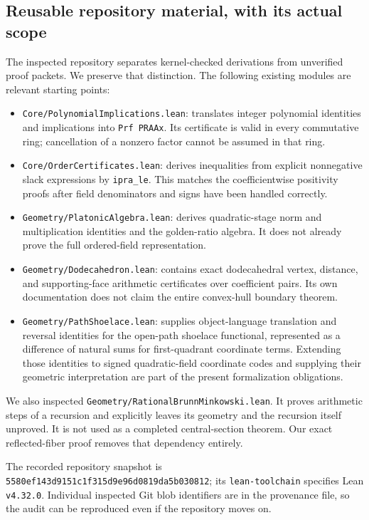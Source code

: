\subsection{Reusable repository material, with its actual scope}
The inspected repository separates kernel-checked derivations from
unverified proof packets. We preserve that distinction. The following
existing modules are relevant starting points:
\begin{itemize}
\item \texttt{Core/PolynomialImplications.lean}: translates integer
polynomial identities and implications into \texttt{Prf PRAAx}.
Its certificate is valid in every commutative ring; cancellation of
a nonzero factor cannot be assumed in that ring.
\item \texttt{Core/OrderCertificates.lean}: derives inequalities
from explicit nonnegative slack expressions by \texttt{ipra\_le}.
This matches the coefficientwise positivity proofs after field
denominators and signs have been handled correctly.
\item \texttt{Geometry/PlatonicAlgebra.lean}: derives quadratic-stage
norm and multiplication identities and the golden-ratio algebra.
It does not already prove the full ordered-field representation.
\item \texttt{Geometry/Dodecahedron.lean}: contains exact dodecahedral
vertex, distance, and supporting-face arithmetic certificates over
coefficient pairs. Its own documentation does not claim the entire
convex-hull boundary theorem.
\item \texttt{Geometry/PathShoelace.lean}: supplies object-language
translation and reversal identities for the open-path shoelace
functional, represented as a difference of natural sums for
first-quadrant coordinate terms. Extending those identities to signed
quadratic-field coordinate codes and supplying their geometric
interpretation are part of the present formalization obligations.
\end{itemize}
We also inspected \texttt{Geometry/RationalBrunnMinkowski.lean}.
It proves arithmetic steps of a recursion and explicitly leaves its
geometry and the recursion itself unproved. It is not used as a
completed central-section theorem. Our exact reflected-fiber proof
removes that dependency entirely.

The recorded repository snapshot is
\texttt{5580ef143d9151c1f315d9e96d0819da5b030812}; its
\texttt{lean-toolchain} specifies Lean \texttt{v4.32.0}.
Individual inspected Git blob identifiers are in the provenance file,
so the audit can be reproduced even if the repository moves on.

